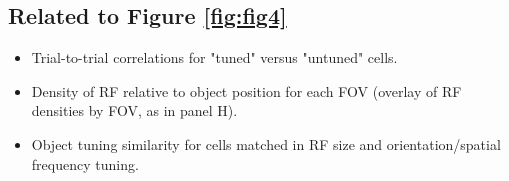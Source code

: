 \documentclass{article}
\begin{document}
\subsection{Related to Figure \ref{fig:fig4}}
\begin{itemize}
\item Trial-to-trial correlations for "tuned" versus "untuned" cells.
\item Density of RF relative to object position for each FOV (overlay of RF densities by FOV, as in panel H).
\item Object tuning similarity for cells matched in RF size and orientation/spatial frequency tuning.
\end{itemize}
\end{document}
